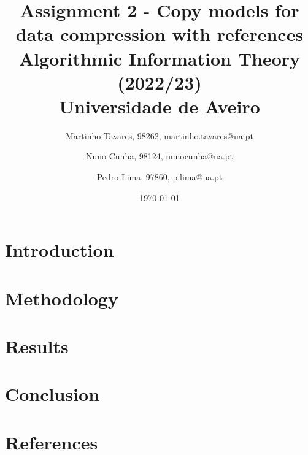 \documentclass{article}
\begin{document}
\title{
    Assignment 2 - Copy models for data compression with references \\
    \large{Algorithmic Information Theory (2022/23) \\
    Universidade de Aveiro}
}

\author{
    Martinho Tavares, 98262, martinho.tavares@ua.pt \and
    Nuno Cunha, 98124, nunocunha@ua.pt \and
    Pedro Lima, 97860, p.lima@ua.pt
}

\date{\today}
\maketitle

\section{Introduction}
\label{sec:introduction}

\section{Methodology}
\label{sec:methodology}

\section{Results}
\label{sec:results}

\section{Conclusion}
\label{sec:conclusion}

\section{References}


\end{document}
